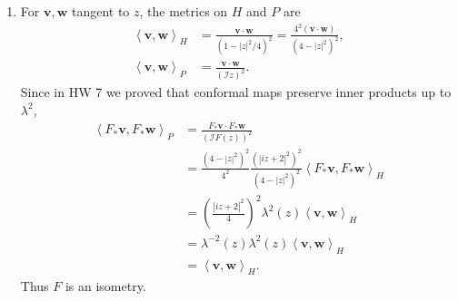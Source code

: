 \documentclass[10pt]{report}
\begin{document}
\begin{enumerate}
	\item For $\mathbf{v},\mathbf{w}$ tangent to $z$, the metrics on $H$ and $P$ are
		\begin{align*}
			\left\langle \mathbf{v},\mathbf{w} \right\rangle_{H} &= \frac{\mathbf{v}\cdot \mathbf{w}}{(1- |z|^2/4)^2} = \frac{4^2 (\mathbf{v}\cdot \mathbf{w})}{(4-|z|^2)^2}, \\
			\left\langle \mathbf{v},\mathbf{w} \right\rangle_{P} &= \frac{\mathbf{v}\cdot \mathbf{w}}{(\mathscr{I} z)^2} .
		\end{align*}
		Since in HW 7 we proved that conformal maps preserve inner products up to $\lambda^2$,
		\begin{align*}
			\left\langle F_{*}\mathbf{v},F_{*}\mathbf{w} \right\rangle_{P} &= \frac{F_{*}\mathbf{v} \cdot F_{*}\mathbf{w}}{(\mathscr{I} F(z))^2} \\
										       &= \frac{(4-|z|^2)^2}{4^2} \frac{(|iz+2|^2)^2}{(4-|z|^2)^2} \left\langle F_{*}\mathbf{v},F_{*}\mathbf{w} \right\rangle_{H} \\
										       &= \left( \frac{|iz+2|^2}{4} \right)^2 \lambda^2(z) \left\langle \mathbf{v},\mathbf{w} \right\rangle_{H}\\
										       &= \lambda^{-2}(z) \lambda^2(z) \left\langle \mathbf{v},\mathbf{w} \right\rangle_{H}\\
										       &= \left\langle \mathbf{v},\mathbf{w} \right\rangle_{H}.
		\end{align*}
		Thus $F$ is an isometry.
\end{enumerate}
\end{document}
